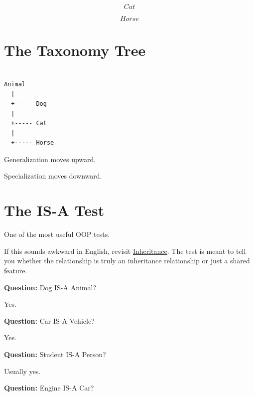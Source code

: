 \documentclass[11pt,a4paper]{book}
\begin{document}
\[
Cat
\]

\[
Horse
\]


\section{The Taxonomy Tree}

\begin{verbatim}

Animal
  |
  +----- Dog
  |
  +----- Cat
  |
  +----- Horse

\end{verbatim}


\begin{rosettarule}

Generalization moves upward.

Specialization moves downward.

\end{rosettarule}


\section{The IS-A Test}
One of the most useful OOP tests.

If this sounds awkward in English, revisit \hyperref[chap:inheritance]{Inheritance}. The test is meant to tell you whether the relationship is truly an inheritance relationship or just a shared feature.


\textbf{Question:}
 Dog IS-A Animal?

            Yes.


\textbf{Question:} 
Car IS-A Vehicle?

            Yes.


\textbf{Question:} 
Student IS-A Person?

            Usually yes.


\textbf{Question:} 
Engine IS-A Car?
            
\end{document}
